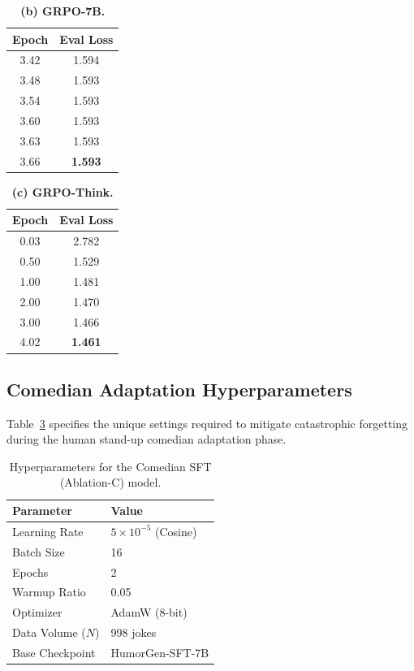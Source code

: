 \documentclass[11pt]{article}
\begin{document}
\begin{table}[!ht]
\centering
\scriptsize
\caption{\textbf{(b) GRPO-7B.}}
\label{tab:eval_loss_grpo}
\begin{tabular}{cc}
\toprule
\textbf{Epoch} & \textbf{Eval Loss} \\
\midrule
3.42 & 1.594 \\
3.48 & 1.593 \\
3.54 & 1.593 \\
3.60 & 1.593 \\
3.63 & 1.593 \\
3.66 & \textbf{1.593} \\
\bottomrule
\end{tabular}
\end{table}

\begin{table}[!ht]
\centering
\scriptsize
\caption{\textbf{(c) GRPO-Think.}}
\label{tab:eval_loss_grpo_think}
\begin{tabular}{cc}
\toprule
\textbf{Epoch} & \textbf{Eval Loss} \\
\midrule
0.03 & 2.782 \\
0.50 & 1.529 \\
1.00 & 1.481 \\
2.00 & 1.470 \\
3.00 & 1.466 \\
4.02 & \textbf{1.461} \\
\bottomrule
\end{tabular}
\end{table}

\newpage
\subsection{Comedian Adaptation Hyperparameters}
\label{sec:appendix_comedian_hyperparams}
Table~\ref{tab:comedian_hyperparams_detail} specifies the unique settings required to mitigate catastrophic forgetting during the human stand-up comedian adaptation phase.

\begin{table}[ht]
\centering
\small
\begin{tabular}{ll}
\toprule
\textbf{Parameter} & \textbf{Value} \\
\midrule
Learning Rate & $5 \times 10^{-5}$ (Cosine) \\
Batch Size & 16 \\
Epochs & 2 \\
Warmup Ratio & 0.05 \\
Optimizer & AdamW (8-bit) \\
Data Volume ($N$) & 998 jokes \\
Base Checkpoint & HumorGen-SFT-7B \\
\bottomrule
\end{tabular}
\caption{Hyperparameters for the Comedian SFT (Ablation-C) model.}
\label{tab:comedian_hyperparams_detail}
\end{table}
\end{document}
